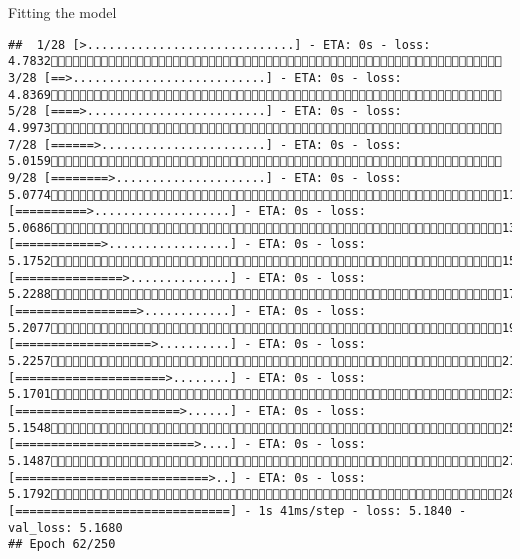 \documentclass[
  ignorenonframetext,
]{beamer}
\begin{document}
\begin{frame}[fragile]{Fitting the model}
\begin{verbatim}
##  1/28 [>.............................] - ETA: 0s - loss: 4.7832 3/28 [==>...........................] - ETA: 0s - loss: 4.8369 5/28 [====>.........................] - ETA: 0s - loss: 4.9973 7/28 [======>.......................] - ETA: 0s - loss: 5.0159 9/28 [========>.....................] - ETA: 0s - loss: 5.077411/28 [==========>...................] - ETA: 0s - loss: 5.068613/28 [============>.................] - ETA: 0s - loss: 5.175215/28 [===============>..............] - ETA: 0s - loss: 5.228817/28 [=================>............] - ETA: 0s - loss: 5.207719/28 [===================>..........] - ETA: 0s - loss: 5.225721/28 [=====================>........] - ETA: 0s - loss: 5.170123/28 [=======================>......] - ETA: 0s - loss: 5.154825/28 [=========================>....] - ETA: 0s - loss: 5.148727/28 [===========================>..] - ETA: 0s - loss: 5.179228/28 [==============================] - 1s 41ms/step - loss: 5.1840 - val_loss: 5.1680
## Epoch 62/250

\end{verbatim}
\end{frame}
\end{document}
